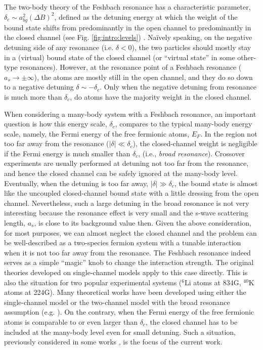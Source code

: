 \documentclass[reprint,pra]{revtex4-1}
\providecommand{\abs}[1]{\ensuremath{\left\lvert{#1}\right\rvert}}
\begin{document}
  The two-body theory of the Feshbach resonance has a characteristic  parameter, $\delta_c\sim{}a_{bg}^2(\Delta{B})^2$, defined as  the detuning energy at which the weight of the bound state shifts from predominantly in the open channel to predominantly in the closed channel (see Fig. \ref{fig:intro:levels}) \cite{Leggett}.  Na\"{i}vely speaking, on the negative detuning side of any resonance (i.e. $\delta<0$), the two particles should mostly stay  in a (virtual) bound state of the closed channel (or ``virtual state'' in some other-type resonances).  However, at the resonance point  of a Feshbach resonance ($a_s\to\pm\infty$), the atoms are mostly still in the open channel, and they do so down to a negative detuning $\delta\sim-\delta_c$. Only when the negative detuning from resonance is much more  than $\delta_c$, do atoms have the majority weight in the closed channel.    
  
  When considering a many-body system with a Feshbach resonance, an important question is how this energy scale, $\delta_c$, compares to the typical many-body energy scale, namely, the Fermi energy of the free fermionic atoms, $E_F$. In the region not too far away from the resonance ($\abs{\delta}\ll\delta_{c}$), the closed-channel weight is negligible if the Fermi energy is much smaller than $\delta_c$, (i.e., \emph{broad resonance}).  Crossover experiments are usually performed at detuning not too far from the resonance, and hence the closed channel can be safely ignored at the many-body level. Eventually, when the detuning is too far away, $\abs{\delta}\gg\delta_{c}$, the bound state is almost like the    uncoupled closed-channel bound state with a little dressing from the open channel.  
  Nevertheless, such a large detuning in the broad resonance is not very interesting because the  resonance effect is very small and the s-wave scattering length, $a_s$, is close to its background  value then.  
 Given the above consideration, for most purposes, we can almost neglect the closed channel  and the problem can be well-described as a two-species fermion system with a tunable interaction when it is not too far away from the resonance.  The Feshbach resonance indeed serves as a simple ``magic'' knob to change the interaction strength.  The original  theories developed on  single-channel models  apply to this case directly.  This is also the situation for two  popular experimental systems (${}^{6}\text{Li}$ atoms at 834G, $^{40}\text{K}$ atoms at 224G).   Many theoretical works have been developed using either the single-channel model or  the two-channel model with the broad resonance assumption (e.g. \cite{Holland01,HoUniversal,Fuchs04}). On the contrary, when the Fermi energy of the free fermionic atoms is  comparable to or even larger than $\delta_c$, the closed channel has to be included at the many-body level even for small detuning. Such a situation, previously considered in some works \cite{GurarieNarrow}, is the focus of the current work.
  
\end{document}
